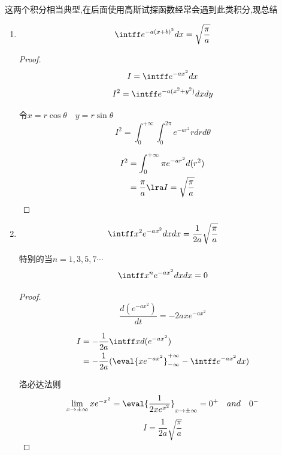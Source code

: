         
        \begin{formal}
        这两个积分相当典型,在后面使用高斯试探函数经常会遇到此类积分,现总结
        

        \begin{enumerate}
            \item 
                $$ \intff e^{-a (x+b)^{2}} dx = \sqrt{\frac{\pi}{a}} $$
            \begin{proof}
                \pfindent 

                $$I=\intff e^{-a x^{2}} dx$$
                $$I^{2}= \intff e^{-a (x^{2}+y^{2})} dx dy $$

                令$x=r\cos{\theta} \quad y=r\sin{\theta}$
                $$ I^{2} = \int_{0}^{+\infty} \int_{0}^{2\pi} e^{-a r^{2}} rdrd\theta $$
               
                \begin{align*}
                    I^{2} &= \int_{0}^{+\infty} \pi  e^{-a r^{2}}d(r^{2})   \\
                          &= \frac{\pi}{a}  \lra I = \sqrt{\frac{\pi}{a}} 
                \end{align*}
            
            \end{proof}

            \item 
                $$ \intff x^{2} e^{-a x^{2}} dxdx = \frac{1}{2a} \sqrt{\frac{\pi}{a}} $$

                特别的当$n=1,3,5,7\cdots$
                $$ \intff x^{n} e^{-a x^{2}} dxdx = 0 $$

                \begin{proof}
                    \pfindent
                    $$ \frac{d(e^{-a x^{2}})}{dt} = -2a x e^{-a x^{2}} $$
                    
                    \begin{align*}
                        I &= -\frac{1}{2a} \intff x d(e^{-a x^{2}})                                         \\
                          &= -\frac{1}{2a} (\eval{x e^{-a x^{2}}}_{-\infty}^{+\infty} - \intff e^{-a x^{2}}dx )
                    \end{align*}

                    洛必达法则
                    $$ \lim_{x \to \pm \infty} x e^{-x^{2}} = \eval{\frac{1}{2x e^{x^{2}}}}_{x \to \pm \infty} = 0^{+} \quad and \quad 0^{-} $$ 
                    $$ I = \frac{1}{2a} \sqrt{\frac{\pi}{a}}$$


\end{proof}
\end{enumerate}
\end{formal}
